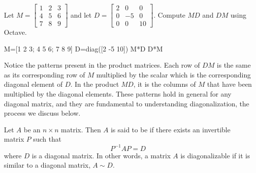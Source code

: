 \documentclass{ximera}
\begin{document}
\begin{exploration}\label{init:multiplydiag}
Let
$M =\begin{bmatrix}1 & 2 & 3\\ 4&5&6\\7&8&9\end{bmatrix}$ and let $D =\begin{bmatrix}2 & 0 & 0\\ 0&-5&0\\0&0&10\end{bmatrix}$.  Compute $MD$ and $DM$ using Octave.

M=[1 2 3; 4 5 6; 7 8 9]
D=diag([2 -5 10]) 
M*D
D*M


Notice the patterns present in the product matrices.  Each row of $DM$ is the same as its corresponding row of $M$ multiplied by the scalar which is the corresponding diagonal element of $D$.  In the product $MD$, it is the columns of $M$ that have been multiplied by the diagonal elements. These patterns hold in general for any diagonal matrix, and they are fundamental to understanding diagonalization, the process we discuss below.
\end{exploration}

\begin{definition}\label{def:diagonalizable}
Let $A$ be an $n\times n$ matrix. Then $A$ is said to be  if there exists an invertible matrix $P$ such that
\begin{equation*}
P^{-1}AP=D
\end{equation*}
where $D$ is a diagonal matrix.  In other words, a matrix $A$ is diagonalizable if it is similar to a diagonal matrix, $A \sim D$.
\end{definition}
\end{document}

